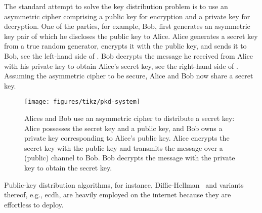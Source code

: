 The standard attempt to solve the key distribution problem is to use an asymmetric cipher comprising a public key for encryption and a private key for decryption.
One of the parties, for example, Bob, first generates an asymmetric key pair of which he discloses the public key to Alice.
Alice generates a secret key from a true random generator, encrypts it with the public key, and sends it to Bob, see the left-hand side of .
Bob decrypts the message he received from Alice with his private key to obtain Alice's secret key, see the right-hand side of .
Assuming the asymmetric cipher to be secure, Alice and Bob now share a secret key.
\begin{figure}[htb]
	\centering
	\texttt{[image: figures/tikz/pkd-system]}
	\caption{Alices and Bob use an asymmetric cipher to distribute a secret key: Alice possesses the secret key and a public key, and Bob owns a private key corresponding to Alice's public key. Alice encrypts the secret key with the public key and transmits the message over a (public) channel to Bob. Bob decrypts the message with the private key to obtain the secret key.}\label{fig:pkd_system}
\end{figure}
Public-key distribution algorithms, for instance, Diffie-Hellman~\cite{Diffie1976} and variants thereof, e.g., \gls{ecdh}, are heavily employed on the internet because they are effortless to deploy.

